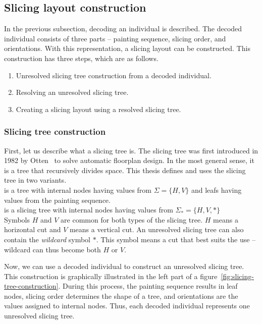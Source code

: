 \subsection{Slicing layout construction}\label{subsec:slicing-tree-construction}
In the previous subsection, decoding an individual is described.
The decoded individual consists of three parts – painting sequence, slicing order, and orientations.
With this representation, a slicing layout can be constructed.
This construction has three steps, which are as follows.

\begin{enumerate}
    \item Unresolved slicing tree construction from a decoded individual.
    \item Resolving an unresolved slicing tree.
    \item Creating a slicing layout using a resolved slicing tree.
\end{enumerate}


\subsubsection*{Slicing tree construction}

First, let us describe what a slicing tree is.
The slicing tree was first introduced in 1982 by Otten~\cite{ottenAutomaticFloorplanDesign1982} to solve automatic floorplan design.
In the most general sense, it is a tree that recursively divides space.
This thesis defines and uses the slicing tree in two variants.\\

 is a tree with internal nodes having values from $\Sigma = \{H, V\}$
and leafs having values from the painting sequence.\\

 is a slicing tree with internal nodes having values from $\Sigma_* = \{H, V, *\}$ \\

Symbols $H$ and $V$ are common for both types of the slicing tree.
$H$ means a horizontal cut and $V$ means a vertical cut.
An unresolved slicing tree can also contain the \textit{wildcard} symbol $*$.
This symbol means a cut that best suits the use – wildcard can thus become both $H$ or $V$.

Now, we can use a decoded individual to construct an unresolved slicing tree.
This construction is graphically illustrated in the left part of a figure~\ref{fig:slicing-tree-construction}.
During this process, the painting sequence results in leaf nodes, slicing order determines the shape of a tree, and orientations are the values assigned to internal nodes.
Thus, each decoded individual represents one unresolved slicing tree.

